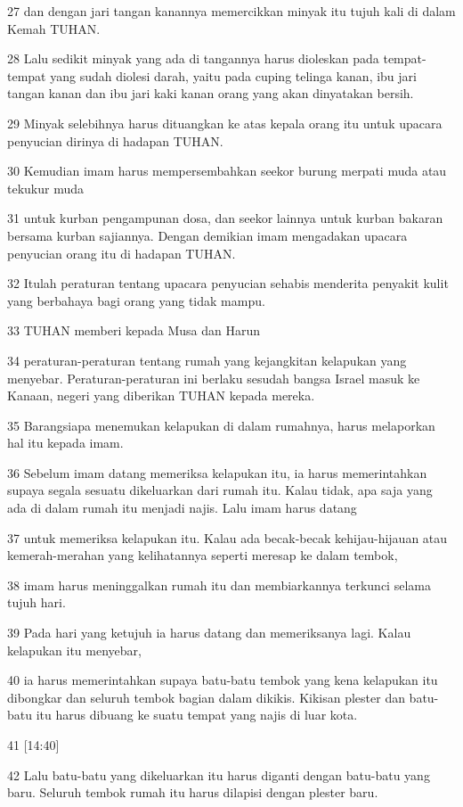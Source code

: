 \par 27 dan dengan jari tangan kanannya memercikkan minyak itu tujuh kali di dalam Kemah TUHAN.
\par 28 Lalu sedikit minyak yang ada di tangannya harus dioleskan pada tempat-tempat yang sudah diolesi darah, yaitu pada cuping telinga kanan, ibu jari tangan kanan dan ibu jari kaki kanan orang yang akan dinyatakan bersih.
\par 29 Minyak selebihnya harus dituangkan ke atas kepala orang itu untuk upacara penyucian dirinya di hadapan TUHAN.
\par 30 Kemudian imam harus mempersembahkan seekor burung merpati muda atau tekukur muda
\par 31 untuk kurban pengampunan dosa, dan seekor lainnya untuk kurban bakaran bersama kurban sajiannya. Dengan demikian imam mengadakan upacara penyucian orang itu di hadapan TUHAN.
\par 32 Itulah peraturan tentang upacara penyucian sehabis menderita penyakit kulit yang berbahaya bagi orang yang tidak mampu.
\par 33 TUHAN memberi kepada Musa dan Harun
\par 34 peraturan-peraturan tentang rumah yang kejangkitan kelapukan yang menyebar. Peraturan-peraturan ini berlaku sesudah bangsa Israel masuk ke Kanaan, negeri yang diberikan TUHAN kepada mereka.
\par 35 Barangsiapa menemukan kelapukan di dalam rumahnya, harus melaporkan hal itu kepada imam.
\par 36 Sebelum imam datang memeriksa kelapukan itu, ia harus memerintahkan supaya segala sesuatu dikeluarkan dari rumah itu. Kalau tidak, apa saja yang ada di dalam rumah itu menjadi najis. Lalu imam harus datang
\par 37 untuk memeriksa kelapukan itu. Kalau ada becak-becak kehijau-hijauan atau kemerah-merahan yang kelihatannya seperti meresap ke dalam tembok,
\par 38 imam harus meninggalkan rumah itu dan membiarkannya terkunci selama tujuh hari.
\par 39 Pada hari yang ketujuh ia harus datang dan memeriksanya lagi. Kalau kelapukan itu menyebar,
\par 40 ia harus memerintahkan supaya batu-batu tembok yang kena kelapukan itu dibongkar dan seluruh tembok bagian dalam dikikis. Kikisan plester dan batu-batu itu harus dibuang ke suatu tempat yang najis di luar kota.
\par 41 [14:40]
\par 42 Lalu batu-batu yang dikeluarkan itu harus diganti dengan batu-batu yang baru. Seluruh tembok rumah itu harus dilapisi dengan plester baru.
